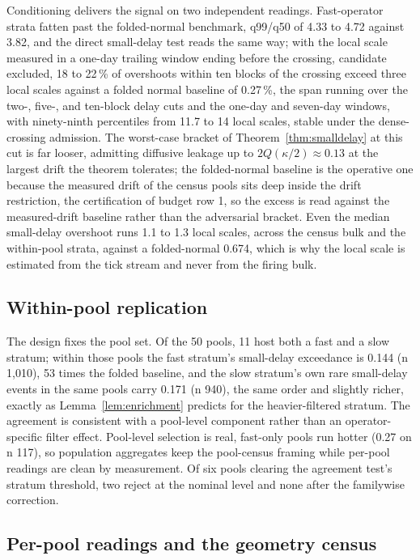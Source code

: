 \documentclass[11pt,a4paper]{article}
\theoremstyle{definition}
\theoremstyle{plain}
\theoremstyle{remark}
\newcommand{\surv}{Q}
\begin{document}
Conditioning delivers the signal on two independent readings. Fast-operator strata fatten past the folded-normal benchmark, q99/q50 of 4.33 to 4.72 against 3.82, and the direct 
small-delay test reads the same way; with the local scale measured in a one-day trailing window ending before the crossing, candidate excluded, 18 to 22\,\% of overshoots within 
ten blocks of the crossing exceed three local scales against a folded normal baseline of 0.27\,\%, the span running over the two-, five-, and ten-block delay cuts and the one-day 
and seven-day windows, with ninety-ninth percentiles from 11.7 to 14 local scales, stable under the dense-crossing admission. The worst-case bracket of Theorem~\ref{thm:smalldelay} 
at this cut is far looser, admitting diffusive leakage up to $2\surv(\kappa/2) \approx 0.13$ at the largest drift the theorem tolerates; the folded-normal baseline is the operative 
one because the measured drift of the census pools sits deep inside the drift restriction, the certification of budget row 1, so the excess is read against the measured-drift 
baseline rather than the adversarial bracket. Even the median small-delay overshoot runs 1.1 to 1.3 local scales, across the census bulk and the within-pool strata, against a 
folded-normal 0.674, which is why the local scale is estimated from the tick stream and never from the firing bulk.

\subsection{Within-pool replication}\label{sec:withinpool}

The design fixes the pool set. Of the 50 pools, 11 host both a fast and a slow stratum; within those pools the fast stratum's small-delay exceedance is 0.144 (n 1{,}010), 53 
times the folded baseline, and the slow stratum's own rare small-delay events in the same pools carry 0.171 (n 940), the same order and slightly richer, exactly as Lemma~\ref{lem:enrichment} 
predicts for the heavier-filtered stratum. The agreement is consistent with a pool-level component rather than an operator-specific filter effect. Pool-level selection is real, 
fast-only pools run hotter (0.27 on n 117), so population aggregates keep the pool-census framing while per-pool readings are clean by measurement. Of six pools clearing the 
agreement test's stratum threshold, two reject at the nominal level and none after the familywise correction.

\subsection{Per-pool readings and the geometry census}\label{sec:perpool}
\end{document}
